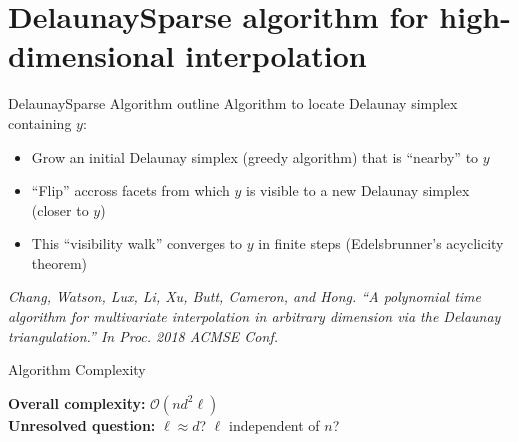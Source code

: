 \documentclass[aspectratio=169]{beamer}
\begin{document}
\section{DelaunaySparse algorithm for high-dimensional interpolation}

\begin{frame}{DelaunaySparse Algorithm outline}
Algorithm to locate Delaunay simplex containing $y$:
\begin{itemize}
\item Grow an initial Delaunay simplex (greedy algorithm) that is
``nearby'' to $y$
\item ``Flip'' accross facets from which $y$ is visible to a new Delaunay
simplex (closer to $y$)
\item This ``visibility walk'' converges to $y$ in finite steps
(Edelsbrunner's acyclicity theorem)
\end{itemize}
\vfill
{\tiny \it Chang, Watson, Lux, Li, Xu, Butt, Cameron, and Hong.
``A polynomial time algorithm for multivariate interpolation in arbitrary
dimension via the Delaunay triangulation.''
In Proc. 2018 ACMSE Conf.}
\end{frame}

\begin{frame}{Algorithm Complexity}
\medskip
\pause
{\bf Overall complexity:} $\mathcal{O}(nd^2 \ell)$\\
\medskip
\pause
{\bf Unresolved question:} $\ell \approx d$? $\ell$ independent of $n$?
\end{frame}
\end{document}
